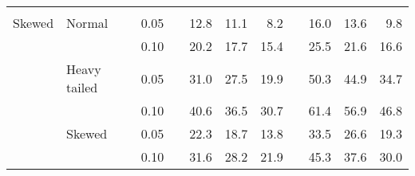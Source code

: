 \begin{table}[ht]
\begin{scriptsize}
\begin{center}
\begin{tabular}{ll p{.1cm} c p{.1cm} rrr p{.1cm} rrr}
&&&&&&&&&&&\\
Skewed       & Normal       && 0.05 &&   12.8 & 11.1 & 8.2 &   & 16.0 & 13.6 & 9.8 \\ 
             &              && 0.10 &&   20.2 & 17.7 & 15.4 &   & 25.5 & 21.6 & 16.6 \\ 
             & Heavy tailed && 0.05 &&   31.0 & 27.5 & 19.9 &   & 50.3 & 44.9 & 34.7 \\ 
             &              && 0.10 &&   40.6 & 36.5 & 30.7 &   & 61.4 & 56.9 & 46.8 \\ 
             & Skewed       && 0.05 &&   22.3 & 18.7 & 13.8 &   & 33.5 & 26.6 & 19.3 \\ 
             &              && 0.10 &&   31.6 & 28.2 & 21.9 &   & 45.3 & 37.6 & 30.0 \\ 


\end{tabular}
\end{center}
\end{scriptsize}
\end{table}
